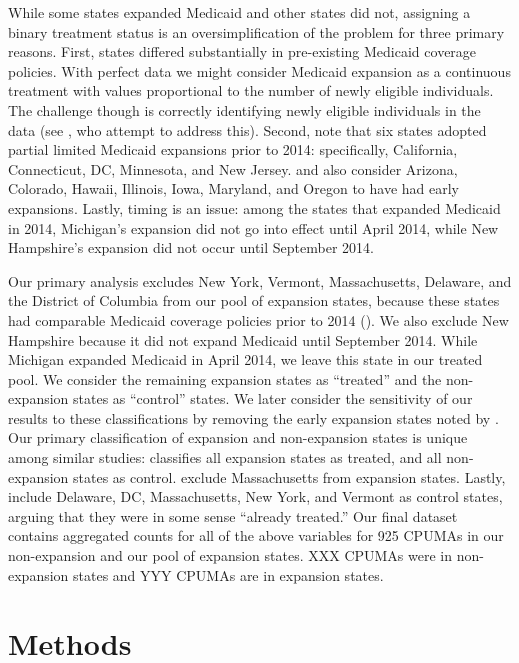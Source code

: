 \documentclass[12pt]{article}
\begin{document}
While some states expanded Medicaid and other states did not, assigning a binary treatment status is an oversimplification of the problem for three primary reasons. First, states differed substantially in pre-existing Medicaid coverage policies. With perfect data we might consider Medicaid expansion as a continuous treatment with values proportional to the number of newly eligible individuals. The challenge though is correctly identifying newly eligible individuals in the data (see \cite{frean2017premium}, who attempt to address this). Second, \cite{frean2017premium} note that six states adopted partial limited Medicaid expansions prior to 2014: specifically, California, Connecticut, DC, Minnesota, and New Jersey. \cite{kaestner2017effects} and \cite{courtemanche2017early} also consider Arizona, Colorado, Hawaii, Illinois, Iowa, Maryland, and Oregon to have had early expansions. Lastly, timing is an issue: among the states that expanded Medicaid in 2014, Michigan's expansion did not go into effect until April 2014, while New Hampshire's expansion did not occur until September 2014.

Our primary analysis excludes New York, Vermont, Massachusetts, Delaware, and the District of Columbia from our pool of expansion states, because these states had comparable Medicaid coverage policies prior to 2014 (\cite{kaestner2017effects}). We also exclude New Hampshire because it did not expand Medicaid until September 2014. While Michigan expanded Medicaid in April 2014, we leave this state in our treated pool. We consider the remaining expansion states as ``treated'' and the non-expansion states as ``control'' states. We later consider the sensitivity of our results to these classifications by removing the early expansion states noted by \cite{frean2017premium}. Our primary classification of expansion and non-expansion states is unique among similar studies: \cite{courtemanche2017early} classifies all expansion states as treated, and all non-expansion states as control. \cite{frean2017premium} exclude Massachusetts from expansion states. Lastly, \cite{kaestner2017effects} include Delaware, DC, Massachusetts, New York, and Vermont as control states, arguing that they were in some sense ``already treated.'' Our final dataset contains aggregated counts for all of the above variables for 925 CPUMAs in our non-expansion and our pool of expansion states. XXX CPUMAs were in non-expansion states and YYY CPUMAs are in expansion states.

\section{Methods}
\label{sec:methods}
\end{document}
